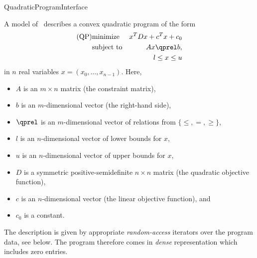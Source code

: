 \begin{ccRefConcept}{QuadraticProgramInterface}

\ccDefinition
A model of \ccRefName\ describes a convex quadratic program of the form
\begin{eqnarray*}
\mbox{(QP)}& \mbox{minimize} & x^{T}Dx+c^{T}x+c_0 \\
&\mbox{subject to}   & Ax\qprel b, \\
&                    & l \leq x \leq u
\end{eqnarray*}
in $n$ real variables $x=(x_0,\ldots,x_{n-1})$.
Here, 
\begin{itemize}
\item $A$ is an $m\times n$ matrix (the constraint matrix), 
\item $b$ is an $m$-dimensional vector (the right-hand side),
\item $\qprel$ is an $m$-dimensional vector of relations 
from $\{\leq, =, \geq\}$, 
\item $l$ is an $n$-dimensional vector of lower
bounds for $x$,
\item $u$ is an $n$-dimensional vector of upper bounds for
$x$, 
\item $D$ is a symmetric positive-semidefinite $n\times n$ matrix (the
  quadratic objective function),
\item $c$ is an $n$-dimensional vector (the linear objective
  function), and 
\item $c_0$ is a constant.
\end{itemize}

The description is given by appropriate \emph{random-access} 
iterators over the program data, see below. The program therefore 
comes in \emph{dense} representation which includes zero entries.

\ccHasModels
{}\\
\\

\ccTypes




\end{ccRefConcept}
